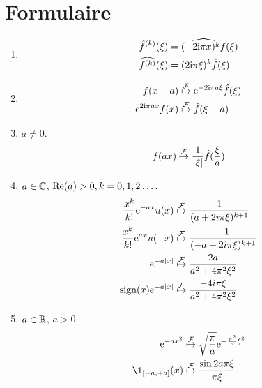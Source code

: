 \section{Formulaire}
\label{sec:formulaire}
\begin{enumerate}[label=(\roman*)]
\item
\begin{align*}
\hat{f}^{(k)}(\xi)&=\widehat{(-2\mathrm{i}\pi x)^{k}f}(\xi)\\
\widehat{f^{(k)}}(\xi)&=(2\mathrm{i} \pi\xi)^{k}\hat{f}(\xi)
\end{align*}
\item
\begin{align*}
f(x-a) &\stackrel{\mathcal{F}}{\mapsto} \mathrm{e}^{-2\mathrm{i} \pi a\xi}\hat{f}(\xi) \\
\mathrm{e}^{2 \mathrm{i} \pi ax}f(x)&\stackrel{\mathcal{F}}{\mapsto} \hat{f}(\xi-a) \\
\end{align*}
\item $a\neq 0$.
$$ f(ax)\stackrel{\mathcal{F}}{\mapsto} \frac{1}{|\xi|}\hat{f}(\frac{\xi}{a})$$
\item  $a\in \mathbb{C}$, ${\rm Re}(a)>0, k=0,1,2\ldots.$
\begin{align*}
\frac{x^{k}}{k!}\mathrm{e}^{-ax}u(x) &\stackrel{\mathcal{F}}{\mapsto} \frac{1}{(a+2i\pi\xi)^{k+1}} \\
\frac{x^{k}}{k!}\mathrm{e}^{ax}u(-x) &\stackrel{\mathcal{F}}{\mapsto} \frac{-1}{(-a+2i\pi\xi)^{k+1}} \\
\mathrm{e}^{-a|x|} &\stackrel{\mathcal{F}}{\mapsto} \frac{2a}{a^{2}+4\pi^{2}\xi^{2}} \\
\mathrm{sign}(x)\mathrm{e}^{-a|x|} &\stackrel{\mathcal{F}}{\mapsto} \frac{-4i\pi\xi}{a^{2}+4\pi^{2}\xi^{2}} \\
\end{align*}
\item  $a\in \mathbb{R}$, $a>0$.
\begin{align*}
\rme^{-ax^{2}}  &\TFyield \sqrt{\frac{\pi}{a}}\rme^{-\frac{\pi^{2}}{a}\xi^{2}} \\
\1_{\ccint{-a,+a}}(x) &\TFyield \frac{\sin 2a\pi\xi}{\pi\xi}
\end{align*}
\end{enumerate}
